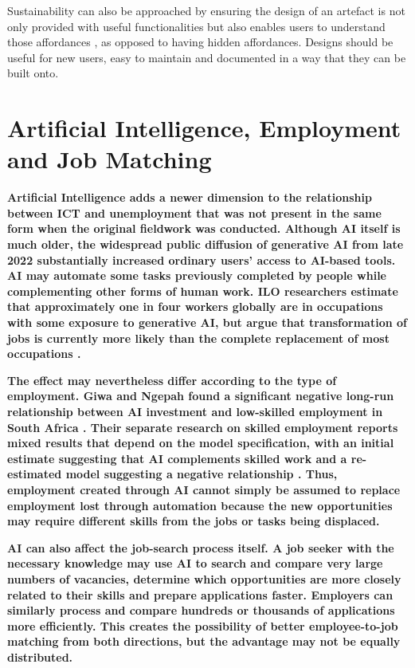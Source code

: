 Sustainability can also be approached by ensuring the design of an artefact is not only provided with useful functionalities but also enables users to understand those affordances \cite{mcgrenere2000}, as opposed to having hidden affordances. Designs should be useful for new users, easy to maintain and documented in a way that they can be built onto.

\section{Artificial Intelligence, Employment and Job Matching}

\textbf{Artificial Intelligence adds a newer dimension to the relationship between ICT and unemployment that was not present in the same form when the original fieldwork was conducted. Although AI itself is much older, the widespread public diffusion of generative AI from late 2022 substantially increased ordinary users' access to AI-based tools. AI may automate some tasks previously completed by people while complementing other forms of human work. ILO researchers estimate that approximately one in four workers globally are in occupations with some exposure to generative AI, but argue that transformation of jobs is currently more likely than the complete replacement of most occupations \cite{ilo2025}.}

\textbf{The effect may nevertheless differ according to the type of employment. Giwa and Ngepah found a significant negative long-run relationship between AI investment and low-skilled employment in South Africa \cite{giwa2024}. Their separate research on skilled employment reports mixed results that depend on the model specification, with an initial estimate suggesting that AI complements skilled work and a re-estimated model suggesting a negative relationship \cite{giwa2024skilled}. Thus, employment created through AI cannot simply be assumed to replace employment lost through automation because the new opportunities may require different skills from the jobs or tasks being displaced.}

\textbf{AI can also affect the job-search process itself. A job seeker with the necessary knowledge may use AI to search and compare very large numbers of vacancies, determine which opportunities are more closely related to their skills and prepare applications faster. Employers can similarly process and compare hundreds or thousands of applications more efficiently. This creates the possibility of better employee-to-job matching from both directions, but the advantage may not be equally distributed.}

